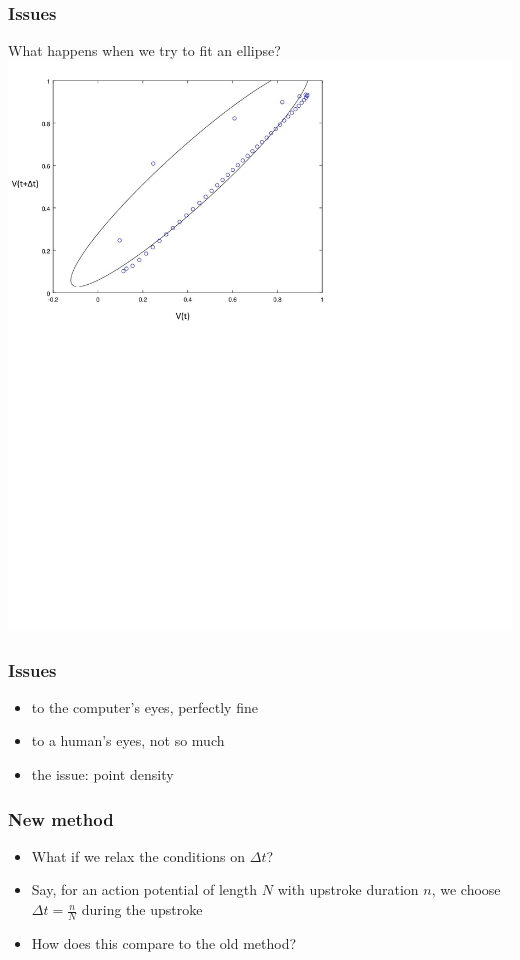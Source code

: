\documentclass{beamer}
\begin{document}
	\begin{frame}
		\frametitle{Issues}
		What happens when we try to fit an ellipse?
		\includegraphics[scale=0.45]{normalellipse.jpg}
	\end{frame}
	
	\begin{frame}
		\frametitle{Issues}
		\begin{itemize}
			\item to the computer's eyes, perfectly fine
			\item to a human's eyes, not so much
			\item the issue: point density
		\end{itemize}
	\end{frame}
	
	\begin{frame}
		\frametitle{New method}
		\begin{itemize}
			\item What if we relax the conditions on $\Delta t$?
			\item Say, for an action potential of length $N$ with upstroke duration $n$, we choose $\Delta t = \frac{n}{N}$ during the upstroke
			\item How does this compare to the old method?
		\end{itemize}
	\end{frame}
	
\end{document}
